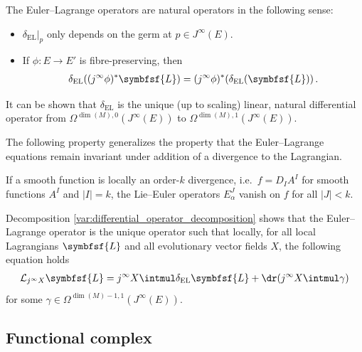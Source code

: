     \begin{property}[Naturality]
        The Euler--Lagrange operators are natural operators in the following sense:
        \begin{itemize}
            \item $\delta_{\text{EL}}|_p$ only depends on the germ at $p\in J^\infty(E)$.
            \item If $\phi:E\rightarrow E'$ is fibre-preserving, then
                \begin{gather}
                    \label{var:naturality}
                    \delta_{\text{EL}}((j^\infty\phi)^*\symbfsf{L}) = (j^\infty\phi)^*(\delta_{\text{EL}}(\symbfsf{L}))\,.
                \end{gather}
        \end{itemize}
        It can be shown that $\delta_{\text{EL}}$ is the unique (up to scaling) linear, natural differential operator from $\Omega^{\dim(M),0}(J^\infty(E))$ to $\Omega^{\dim(M),1}(J^\infty(E))$.
    \end{property}

    The following property generalizes the property that the Euler--Lagrange equations remain invariant under addition of a divergence to the Lagrangian.
    \begin{property}[Divergences]\label{var:EL_operator_divergences}
        If a smooth function is locally an order-$k$ divergence, i.e.~$f=D_IA^I$ for smooth functions $A^I$ and $|I|=k$, the Lie--Euler operators $E^J_\alpha$ vanish on $f$ for all $|J|<k$.
    \end{property}

    \begin{property}\label{var:local_variational_formula}
        Decomposition \ref{var:differential_operator_decomposition} shows that the Euler--Lagrange operator is the unique operator such that locally, for all local Lagrangians $\symbfsf{L}$ and all evolutionary vector fields $X$, the following equation holds
        \begin{gather}
            \mathcal{L}_{j^\infty X}\symbfsf{L} = j^\infty X\intmul\delta_\mathrm{EL}\symbfsf{L} + \dr(j^\infty X\intmul\gamma)
        \end{gather}
        for some $\gamma\in\Omega^{\dim(M)-1,1}(J^\infty(E))$.
    \end{property}

\subsection{Functional complex}

